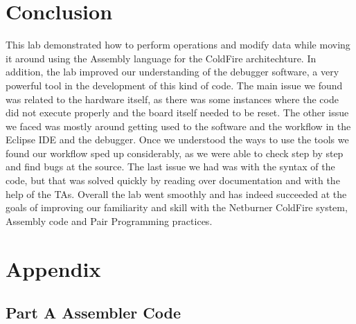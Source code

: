 \documentclass[letterpaper]{article}
\begin{document}
\section{Conclusion}
  This lab demonstrated how to perform operations
  and modify data while moving it around using the Assembly language for the ColdFire architechture.
  In addition, the lab improved our understanding of the debugger software, a very powerful
  tool in the development of this kind of code.  The main issue we found was related
  to the hardware itself, as there was some instances where the code did not execute
  properly and the board itself needed to be reset.  The other issue we faced was mostly
  around getting used to the software and the workflow in the Eclipse IDE and
  the debugger.  Once we understood the ways to use the tools we found our workflow sped up
  considerably, as we were able to check step by step and find bugs at the source.  The last
  issue we had was with the syntax of the code, but that was solved quickly by reading over
  documentation and with the help of the TAs.  Overall the lab went smoothly and has indeed
  succeeded at the goals of improving our familiarity and skill with the Netburner ColdFire system,
  Assembly code and Pair Programming practices.

\newpage
\section{Appendix}
  \subsection{Part A Assembler Code}
    
\newpage
\end{document}

